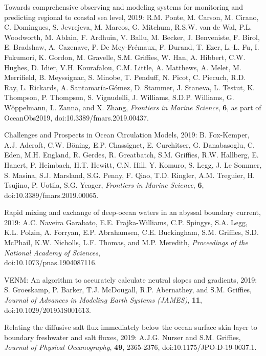 \begin{etaremune}
\item Towards comprehensive observing and modeling systems for monitoring and predicting regional to coastal sea level, 2019: R.M. Ponte, M. Carson, M. Cirano, C. Domingues, S. Jevrejeva, M. Marcos, G. Mitchum, R.S.W. van de Wal, P.L. Woodworth, M. Ablain, F. Ardhuin, V. Ballu, M. Becker, J. Benveniste, F. Birol, E. Bradshaw, A. Cazenave, P. De Mey-{Fr\'{e}maux}, F. Durand, T. Ezer, L.-L. Fu, I. Fukumori, K. Gordon, M. Gravelle, S.M. Grif\/f\/ies, W. Han, A. Hibbert, C.W. Hughes, D. Idier, V.H. Kourafalou, C.M. Little, A. Matthews, A. Melet, M. Merrifield, B. Meyssignac, S. Minobe, T. Penduff, N. Picot, C. Piecuch, R.D. Ray, L. Rickards, A. Santamaría-Gómez, D. Stammer, J. Staneva, L. Testut, K. Thompson, P. Thompson, S. Vignudelli, J. Williams, S.D.P. Williams, G. {W\"{o}ppelmann}, L. Zanna, and X. Zhang, {\it Frontiers in Marine Science}, {\bf 6},  as part of 
OceanObs2019, doi:10.3389/fmars.2019.00437.

\item Challenges and Prospects in Ocean Circulation Models, 2019: B. Fox-Kemper, A.J. Adcroft, C.W. {B\"{o}ning}, E.P. Chassignet, E. Curchitser, G. Danabasoglu, C. Eden, M.H. England, R. Gerdes, R. Greatbatch, S.M. Grif\/f\/ies, R.W. Hallberg, E. Hanert, P. Heimbach, H.T. Hewitt, C.N. Hill, Y. Komuro, S. Legg, J. Le Sommer, S. Masina, S.J. Marsland, S.G. Penny, F. Qiao, T.D. Ringler, A.M. Treguier, H. Tsujino, P. Uotila, S.G. Yeager,
{\it Frontiers in Marine Science}, {\bf 6},
doi:10.3389/fmars.2019.00065.

\item Rapid mixing and exchange of deep-ocean waters in an abyssal boundary current, 2019: A.C. Naveira Garabato, E.E. Frajka-Williams, C.P. Spingys, S.A. Legg, K.L. Polzin, A. Forryan, E.P. Abrahamsen, C.E. Buckingham, S.M. Grif\/f\/ies, S.D. McPhail, K.W. Nicholls, L.F. Thomas, and M.P. Meredith,  {\it Proceedings of the National Academy of Sciences}, \\ doi:10.1073/pnas.1904087116.

\item VENM: An algorithm to accurately calculate neutral slopes and gradients, 2019: S. Groeskamp, P. Barker, T.J. McDougall, R.P. Abernathey, and S.M. Grif\/f\/ies, {\it Journal of Advances in Modeling Earth Systems (JAMES)}, {\bf 11}, doi:10.1029/2019MS001613.

\item Relating the diffusive salt flux immediately below the ocean surface skin layer to boundary freshwater and salt fluxes, 2019: A.J.G. Nurser and S.M. Grif\/f\/ies, {\it Journal of Physical Oceanography}, {\bf 49}, 2365-2376, doi:10.1175/JPO-D-19-0037.1.


\end{etaremune}
